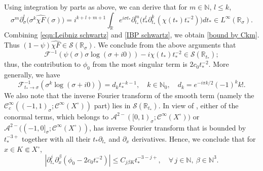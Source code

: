 \documentclass[10pt,a4paper,reqno]{amsart}
\newcommand{\CI}{\mathcal{C}^\infty}
\newcommand{\CcI}{\mathcal{C}_c^\infty}
\newcommand{\RR}{\mathbb{R}}
\newcommand{\NN}{\mathbb{N}}
\newcommand{\A}{\mathcal{A}}
\newcommand{\pa}{\partial}
\newcommand{\inv}{^{-1}}
\theoremstyle{definition}
\theoremstyle{remark}
\numberwithin{equation}{section}
\newcommand{\xs}{\sigma}
\newcommand{\N}{{\mathbb N}}
\newcommand{\R}{\mathbb R}
\newcommand{\calF}{\mathcal F}
\newcommand{\ts}{t_*}
\begin{document}
Using integration by parts as above, we can derive that for $m\in \NN$, $l\leq k$,
\begin{equation}
\label{IBP schwartz}
	\sigma^m \partial_\sigma^l \big(\sigma^k \widehat{\chi F}(\sigma)\big) = i^{k+l+m+1} \int_{\RR} e^{i\sigma t_*} \partial_{t_*}^m \big(t_*^l \partial_{t_*}^k (\chi(t_*) t_*^{-2})\big) d t_* \in L^\infty(\RR_\sigma).
\end{equation}
Combining \eqref{eqn:Leibniz schwartz} and \eqref{IBP schwartz}, we obtain \eqref{bound by Ckm}. Thus $(1-\psi)\widehat{\chi F} \in\mathscr{S}(\RR_\sigma)$. We conclude from the above arguments that
\[
    \mathcal{F}^{-1} (\psi(\sigma)\sigma\log(\sigma+i0)) - i \chi(\ts)t_*^{-2} \in \mathscr{S}(\RR_{\ts});
\]
thus, the contribution to $\phi_0$ from the most singular term is $2c_0 t_*^{-2}$.
More generally,  we have
\[
    \calF_{t_*\to\sigma}\inv ( \sigma^{k}\log(\xs+i0)) = d_k t_*^{-k-1}, \quad k \in \N_0, \quad d_k = e^{-i\pi k/2}(-1)^k k!.
\]
We also note that the inverse Fourier transform of the smooth term (namely the  $\CcI((-1,1)_\sigma;\CI(X^\circ))$ part) lies in $\mathscr{S}(\R_{t_*})$. In view of \cite[Lemma 3.6]{Hin22}, either of the conormal terms, which belongs to $\A^{2-}([0,1)_\sigma;\CI(X^\circ))$ or $\A^{2-}((-1,0]_\sigma;\CI(X^\circ))$, has inverse Fourier transform that is bounded by $t_*^{-3+}$ together with all their $t_*\pa_{\ts}$ and $\pa_x$ derivatives. Hence, we conclude that for $x\in K\Subset X^\circ$,
\begin{equation}
\label{phi0 asymp}
    |\pa_{\ts}^j \pa_x^\beta (\phi_0 - 2c_0 t_*^{-2})|\leq C_{j\beta K} t_*^{-3-j+},\quad \forall\, j\in\mathbb{N},\ \beta\in\mathbb{N}^3.
\end{equation}
\end{document}
